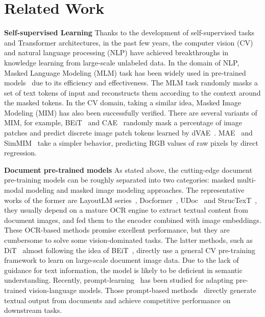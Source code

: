 \documentclass{article} %
\begin{document}
\section{Related Work}
\noindent\textbf{Self-supervised Learning} 
Thanks to the development of self-supervised tasks and Transformer architectures, in the past few years, the computer vision (CV) and natural language processing (NLP) have achieved breakthroughs in knowledge learning from large-scale unlabeled data. In the domain of NLP, Masked Language Modeling (MLM) task has been widely used in pre-trained models~\cite{devlin2018bert,radford2018gpt} due to its efficiency and effectiveness. The MLM task randomly masks a set of text tokens of input and reconstructs them according to the context around the masked tokens. In the CV domain, taking a similar idea, Masked Image Modeling (MIM) has also been successfully verified. There are several variants of MIM, for example, BEiT~\cite{bao2021beit} and CAE~\cite{chen2022context} randomly mask a percentage of image patches and predict discrete image patch tokens learned by dVAE~\cite{ramesh2021dvae}. MAE~\cite{he2021masked} and SimMIM~\cite{Xie00LBYD022} take a simpler behavior, predicting RGB values of raw pixels by direct regression.

\noindent\textbf{Document pre-trained models} 
As stated above, the cutting-edge document pre-training models can be roughly separated into two categories: masked multi-modal modeling and masked image modeling approaches. The representative works of the former are LayoutLM series~\cite{xu2020layoutlm,xu2020layoutlmv2,huang2022layoutlmv3}, Docformer~\cite{appalaraju2021docformer}, UDoc~\cite{nips2021udoc} and StrucTexT~\cite{li2021structext}, they usually depend on a mature OCR engine to extract textual content from document images, and fed them to the encoder combined with image embeddings. These OCR-based methods promise excellent performance, but they are cumbersome to solve some vision-dominated tasks. The latter methods, such as DiT~\cite{li2022dit} almost following the idea of BEiT~\cite{bao2021beit}, directly use a general CV pre-training framework to learn on large-scale document image data. Due to the lack of guidance for text information, the model is likely to be deficient in semantic understanding. Recently, prompt-learning~\cite{LiuYFJHN23} has been studied for adapting pre-trained vision-language models. Those prompt-based methods~\cite{kim2021donut,DavisMPTWM22} directly generate textual output from documents and achieve competitive performance on downstream tasks.
\end{document}
